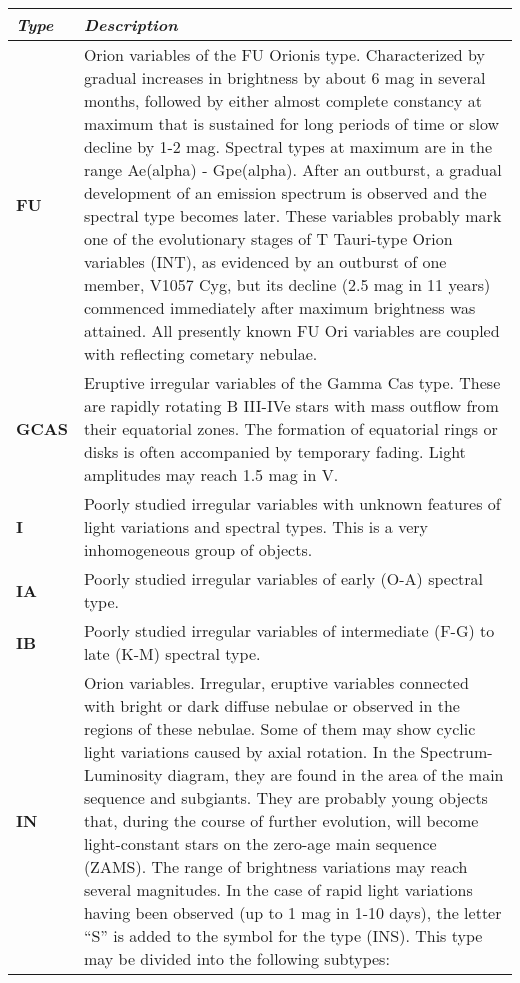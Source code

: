 \begin{longtabu} to \textwidth {l|X}
\toprule
\emph{Type} & \emph{Description}\\
\midrule
\textbf{FU} & Orion variables of the FU Orionis type. Characterized by
gradual increases in brightness by about 6 mag in several months,
followed by either almost complete constancy at maximum that is
sustained for long periods of time or slow decline by 1-2 mag. Spectral
types at maximum are in the range Ae(alpha) - Gpe(alpha). After an
outburst, a gradual development of an emission spectrum is observed and
the spectral type becomes later. These variables probably mark one of
the evolutionary stages of T Tauri-type Orion variables (INT), as
evidenced by an outburst of one member, V1057 Cyg, but its decline (2.5
mag in 11 years) commenced immediately after maximum brightness was
attained. All presently known FU Ori variables are coupled with
reflecting cometary nebulae.\\
\midrule
\textbf{GCAS} & Eruptive irregular variables of the Gamma Cas type.
These are rapidly rotating B III-IVe stars with mass outflow from their
equatorial zones. The formation of equatorial rings or disks is often
accompanied by temporary fading. Light amplitudes may reach 1.5 mag in
V.\\
\midrule
\textbf{I} & Poorly studied irregular variables with unknown features of
light variations and spectral types. This is a very inhomogeneous group
of objects.\\
\midrule
\textbf{IA} & Poorly studied irregular variables of early (O-A) spectral
type.\\
\midrule
\textbf{IB} & Poorly studied irregular variables of intermediate (F-G)
to late (K-M) spectral type.\\
\midrule
\textbf{IN} & Orion variables. Irregular, eruptive variables connected
with bright or dark diffuse nebulae or observed in the regions of these
nebulae. Some of them may show cyclic light variations caused by axial
rotation. In the Spectrum-Luminosity diagram, they are found in the area
of the main sequence and subgiants. They are probably young objects
that, during the course of further evolution, will become light-constant
stars on the zero-age main sequence (ZAMS). The range of brightness
variations may reach several magnitudes. In the case of rapid light
variations having been observed (up to 1 mag in 1-10 days), the letter
``S'' is added to the symbol for the type (INS). This type may be
divided into the following subtypes:\\

\end{longtabu}
